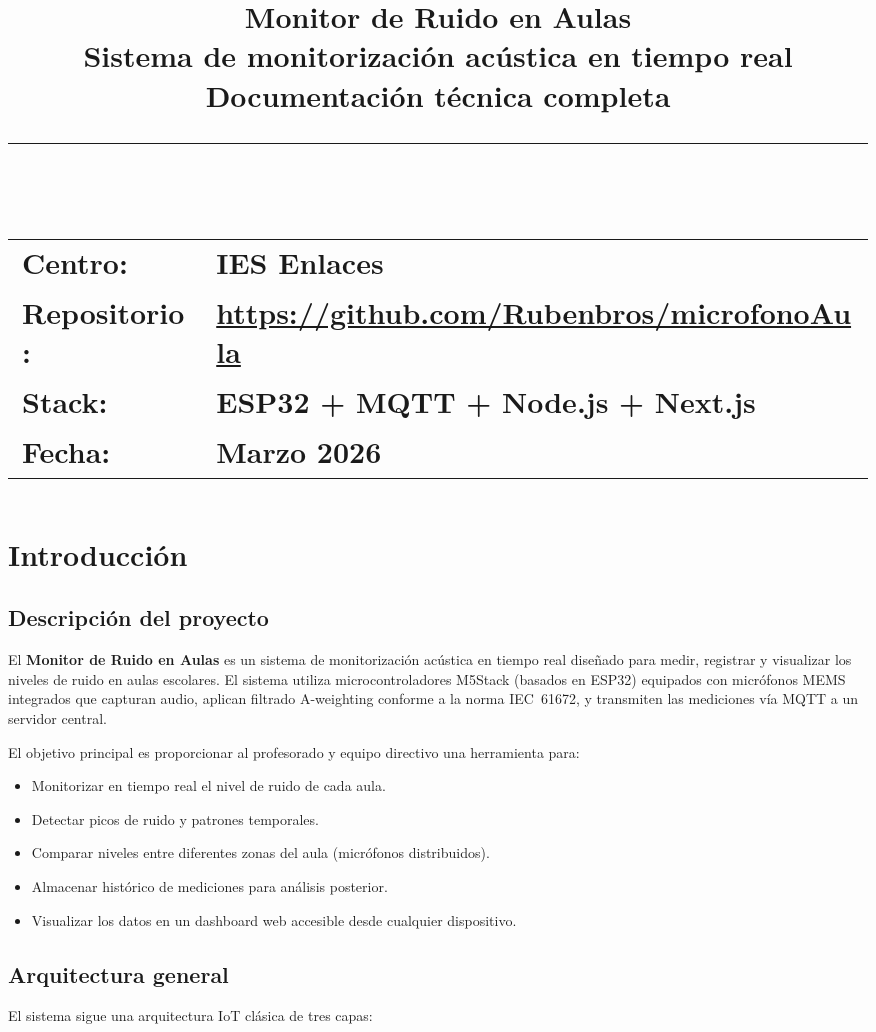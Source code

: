 \documentclass[12pt,a4paper]{report}
\title{
    \vspace{-2cm}
    {\Huge\bfseries Monitor de Ruido en Aulas}\\[0.5cm]
    {\Large Sistema de monitorizaci\'on ac\'ustica en tiempo real}\\[0.5cm]
    {\large Documentaci\'on t\'ecnica completa}\\[1cm]
    \rule{\textwidth}{1pt}\\[0.5cm]
    {\normalsize
    \begin{tabular}{ll}
    \textbf{Centro:} & IES Enlaces \\
    \textbf{Repositorio:} & \url{https://github.com/Rubenbros/microfonoAula} \\
    \textbf{Stack:} & ESP32 + MQTT + Node.js + Next.js \\
    \textbf{Fecha:} & Marzo 2026 \\
    \end{tabular}
    }
}
\author{}
\date{}
\begin{document}
\maketitle
\thispagestyle{empty}

\tableofcontents
\newpage

\chapter{Introducci\'on}

\section{Descripci\'on del proyecto}

El \textbf{Monitor de Ruido en Aulas} es un sistema de monitorizaci\'on ac\'ustica en tiempo real dise\~nado para medir, registrar y visualizar los niveles de ruido en aulas escolares. El sistema utiliza microcontroladores M5Stack (basados en ESP32) equipados con micr\'ofonos MEMS integrados que capturan audio, aplican filtrado A-weighting conforme a la norma IEC~61672, y transmiten las mediciones v\'ia MQTT a un servidor central.

El objetivo principal es proporcionar al profesorado y equipo directivo una herramienta para:

\begin{itemize}
    \item Monitorizar en tiempo real el nivel de ruido de cada aula.
    \item Detectar picos de ruido y patrones temporales.
    \item Comparar niveles entre diferentes zonas del aula (micr\'ofonos distribuidos).
    \item Almacenar hist\'orico de mediciones para an\'alisis posterior.
    \item Visualizar los datos en un dashboard web accesible desde cualquier dispositivo.
\end{itemize}

\section{Arquitectura general}

El sistema sigue una arquitectura IoT cl\'asica de tres capas:
\end{document}
